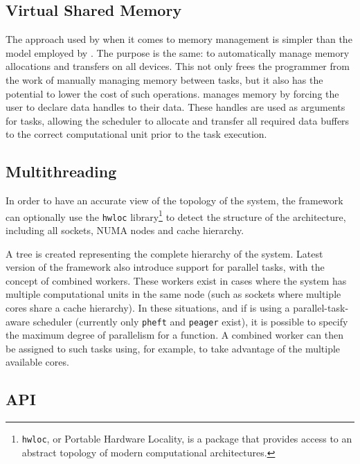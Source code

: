 \documentclass[main.tex]{subfiles}
\begin{document}
\subsection{Virtual Shared Memory}

The approach used by \starpu when it comes to memory management is simpler than the model employed by \gama. The purpose is the same: to automatically manage memory allocations and transfers on all devices. This not only frees the programmer from the work of manually managing memory between tasks, but it also has the potential to lower the cost of such operations.
\starpu manages memory by forcing the user to declare data handles to their data. These handles are used as arguments for tasks, allowing the scheduler to allocate and transfer all required data buffers to the correct computational unit prior to the task execution.

\subsection{Multithreading} \label{section:starpu_multithreading}

In order to have an accurate view of the topology of the system, the framework can optionally use the \texttt{hwloc} library\footnote{\texttt{hwloc}, or Portable Hardware Locality, is a package that provides access to an abstract topology of modern computational architectures.} \cite{broquedis2010hwloc} to detect the structure of the architecture, including all \cpu sockets, \acs{NUMA} nodes and cache hierarchy.

A tree is created representing the complete hierarchy of the system. Latest version of the framework also introduce support for parallel tasks, with the concept of combined workers. These workers exist in cases where the system has multiple computational units in the same node (such as \cpu sockets where multiple cores share a cache hierarchy). In these situations, and if \starpu is using a parallel-task-aware scheduler (currently only \texttt{pheft} and \texttt{peager} exist), it is possible to specify the maximum degree of parallelism for a function. A combined worker can then be assigned to such tasks using, for example, \openmp to take advantage of the multiple available cores.

\subsection{API} \label{section:starpu_api}
\end{document}
